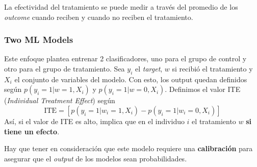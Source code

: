 La efectividad del tratamiento se puede medir a través del promedio de los \textit{outcome} cuando reciben y cuando no reciben el tratamiento. 

\subsubsection{Two ML Models}

Este enfoque plantea entrenar 2 clasificadores, uno para el grupo de control y otro para el grupo de tratamiento. Sea $y_i$ el \textit{target}, $w$ si recibió el tratamiento y $X_i$ el conjunto de variables del modelo. Con esto, los output quedan definidos según $p(y_i = 1 | w = 1, X_i)$ y $p(y_i = 1 | w = 0, X_i)$. 
Definimos el valor ITE (\textit{Individual Treatment Effect}) según 
$$
\text{ITE} = \left [ p(y_i = 1 | w_i = 1, X_i) - p(y_i = 1 | w_i = 0, X_i) \right ]
$$
Así, si el valor de ITE es alto, implica que en el individuo $i$ el tratamiento $w$ \textbf{si tiene un efecto}. 

Hay que tener en consideración que este modelo requiere una \textbf{calibración} para asegurar que el \textit{output} de los modelos sean probabilidades.







